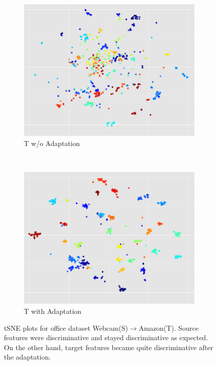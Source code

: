 \begin{figure}[ht]
\begin{subfigure}[b]{0.25\textwidth}
        \includegraphics[width=\textwidth]{before_c_t_c}
        \caption{T w/o Adaptation}
        \label{fig:gull}
    \end{subfigure}~\begin{subfigure}[b]{0.25\textwidth}
        \includegraphics[width=\textwidth]{after_c_t_c}
        \caption{T with Adaptation}
    \end{subfigure}
    \caption{tSNE plots for office dataset Webcam(S)$\rightarrow$Amazon(T). Source features were discriminative and stayed discriminative as expected. On the other hand, target features became quite discriminative after the adaptation.}
    \label{fig:tsne}

\end{figure}
